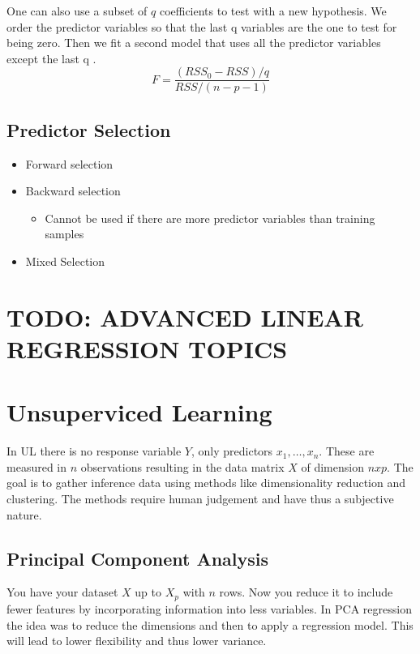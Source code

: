 \documentclass[../Main.tex]{subfiles}
\begin{document}
One can also use a subset of \(q\) coefficients to test with a new hypothesis. We order the predictor variables so that the last q variables are the one to test for being zero. Then we fit a second model that uses all the predictor variables except the last q .
\begin{equation}
    F = \frac{(RSS_0-RSS)/q}{RSS/(n-p-1)}
\end{equation}

\subsection{Predictor Selection}
\begin{itemize}
    \item Forward selection
    \item Backward selection
    \begin{itemize}
        \item Cannot be used if there are more predictor variables than training samples
    \end{itemize}
    \item Mixed Selection
\end{itemize}

\section{TODO: ADVANCED LINEAR REGRESSION TOPICS}

\section{Unsuperviced Learning}
In UL there is no response variable \(Y\), only
predictors \(x_1,\dots ,x_n\). These are measured in
\(n\) observations resulting in the data matrix \(X\)
of dimension \(nxp\). The goal is to gather
inference data using methods like dimensionality reduction
and clustering. The methods require human judgement and have
thus a subjective nature.
\subsection{Principal Component Analysis}
You have your dataset \(X\) up to \(X_p\) with \(n\) rows.
Now you reduce it to include fewer features by incorporating
information into less variables. In PCA regression the idea
was to reduce the dimensions and then to apply a regression model.
This will lead to lower flexibility and thus lower variance.
\end{document}
